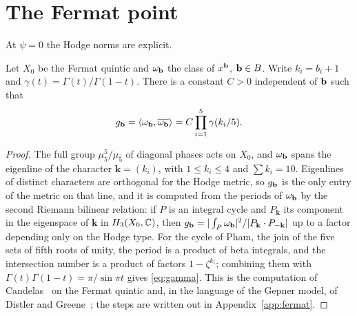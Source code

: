 \section{The Fermat point}\label{sec:fermat}

At $\psi=0$ the Hodge norms are explicit.

\begin{proposition}\label{prop:fermat}
Let $X_0$ be the Fermat quintic and $\omega_{\mathbf{b}}$ the class of $x^{\mathbf{b}}$,
$\mathbf{b}\in B$. Write $k_i=b_i+1$ and $\gamma(t)=\Gamma(t)/\Gamma(1-t)$. There
is a constant $C>0$ independent of $\mathbf{b}$ such that
\begin{equation}\label{eq:gamma}
g_{\mathbf{b}}=\langle \omega_{\mathbf{b}},\overline{\omega_{\mathbf{b}}}\rangle=C\prod_{i=1}^5
\gamma(k_i/5).
\end{equation}
\end{proposition}

\begin{proof}
The full group $\mu_5^5/\mu_5$ of diagonal phases acts on $X_0$, and
$\omega_{\mathbf{b}}$ spans the eigenline of the character $\mathbf k=(k_i)$, with
$1\le k_i\le4$ and $\sum k_i=10$. Eigenlines of distinct characters are
orthogonal for the Hodge metric, so $g_{\mathbf{b}}$ is the only entry of the
metric on that line, and it is computed from the periods of $\omega_{\mathbf{b}}$
by the second Riemann bilinear relation: if $P$ is an integral cycle and
$P_{\mathbf k}$ its component in the eigenspace of $\mathbf k$ in
$H_3(X_0,\mathbb{C})$, then $g_{\mathbf{b}}=|\int_P\omega_{\mathbf{b}}|^2/
|P_{\mathbf k}\cdot P_{-\mathbf k}|$ up to a factor depending only on the
Hodge type. For the cycle of Pham, the join of the five sets of fifth roots
of unity, the period is a product of beta integrals, and the intersection
number is a product of factors $1-\zeta^{k_i}$; combining them with
$\Gamma(t)\Gamma(1-t)=\pi/\sin\pi t$ gives \eqref{eq:gamma}. This is the
computation of Candelas~\cite{Can88} on the Fermat quintic and, in the
language of the Gepner model, of Distler and Greene~\cite{DG88}; the steps
are written out in Appendix~\ref{app:fermat}.
\end{proof}

